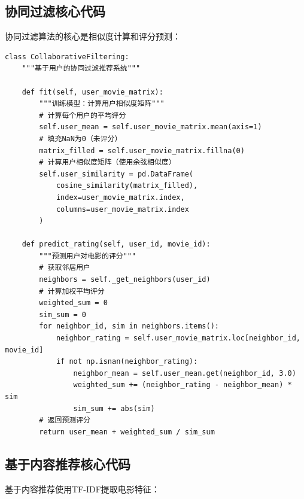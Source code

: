 \documentclass[a4paper]{article}
\begin{document}
\subsection{协同过滤核心代码}

协同过滤算法的核心是相似度计算和评分预测：

\begin{lstlisting}
class CollaborativeFiltering:
    """基于用户的协同过滤推荐系统"""
    
    def fit(self, user_movie_matrix):
        """训练模型：计算用户相似度矩阵"""
        # 计算每个用户的平均评分
        self.user_mean = self.user_movie_matrix.mean(axis=1)
        # 填充NaN为0（未评分）
        matrix_filled = self.user_movie_matrix.fillna(0)
        # 计算用户相似度矩阵（使用余弦相似度）
        self.user_similarity = pd.DataFrame(
            cosine_similarity(matrix_filled),
            index=user_movie_matrix.index,
            columns=user_movie_matrix.index
        )
    
    def predict_rating(self, user_id, movie_id):
        """预测用户对电影的评分"""
        # 获取邻居用户
        neighbors = self._get_neighbors(user_id)
        # 计算加权平均评分
        weighted_sum = 0
        sim_sum = 0
        for neighbor_id, sim in neighbors.items():
            neighbor_rating = self.user_movie_matrix.loc[neighbor_id, movie_id]
            if not np.isnan(neighbor_rating):
                neighbor_mean = self.user_mean.get(neighbor_id, 3.0)
                weighted_sum += (neighbor_rating - neighbor_mean) * sim
                sim_sum += abs(sim)
        # 返回预测评分
        return user_mean + weighted_sum / sim_sum
\end{lstlisting}

\subsection{基于内容推荐核心代码}

基于内容推荐使用TF-IDF提取电影特征：
\end{document}
